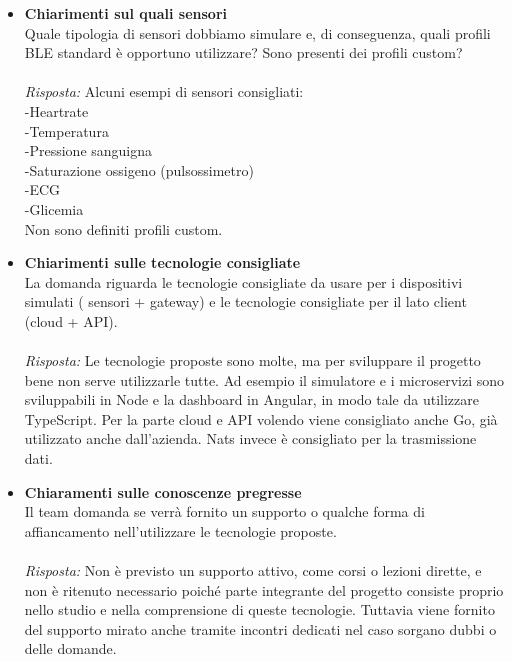 \documentclass[a4paper,12pt]{article}
\begin{document}
\begin{itemize}
     \item \textbf{Chiarimenti sul quali sensori}\\
    \noindent
    Quale tipologia di sensori dobbiamo simulare e, di conseguenza, quali profili BLE standard è opportuno utilizzare? Sono presenti dei profili custom?\\ \\
    \textit{Risposta:} 
    Alcuni esempi di sensori consigliati: \\ 
    -Heartrate \\
    -Temperatura \\
    -Pressione sanguigna \\
    -Saturazione ossigeno (pulsossimetro) \\
    -ECG \\ 
    -Glicemia \\
    Non sono definiti profili custom.
    \vspace{1cm}
    
     \item \textbf{Chiarimenti sulle tecnologie consigliate}\\
    \noindent
    La domanda riguarda le tecnologie consigliate da usare per i dispositivi simulati ( sensori + gateway) e le tecnologie consigliate per il lato client (cloud + API).\\ \\
    \textit{Risposta:} 
    Le tecnologie proposte sono molte, ma per sviluppare il progetto bene non serve utilizzarle tutte. Ad esempio il simulatore e i microservizi sono sviluppabili in Node e la dashboard in Angular, in modo tale da utilizzare TypeScript. Per la parte cloud e API volendo viene consigliato anche Go, già utilizzato anche dall'azienda. Nats invece è consigliato per la trasmissione dati.
    \vspace{1cm}

    \item \textbf{Chiaramenti sulle conoscenze pregresse}\\
    \noindent
    Il team domanda se verrà fornito un supporto o qualche forma di affiancamento nell'utilizzare le tecnologie proposte.\\ \\
    \textit{Risposta:} 
    Non è previsto un supporto attivo, come corsi o lezioni dirette, e non è ritenuto necessario poiché parte integrante del progetto consiste proprio nello studio e nella comprensione di queste tecnologie. Tuttavia viene fornito del supporto mirato anche tramite incontri dedicati nel caso sorgano dubbi o delle domande. 
    \vspace{1cm}
    

\end{itemize}
\end{document}
